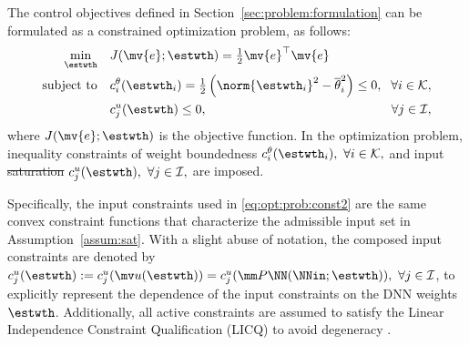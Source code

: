\documentclass[letterpaper, journal, twoside]{IEEEtran}
\providecommand{\DIFadd}[1]{{\protect\color{blue}\uwave{#1}}} %
\providecommand{\DIFdel}[1]{{\protect\color{red}\sout{#1}}} %
\providecommand{\DIFaddbegin}{} %
\providecommand{\DIFaddend}{} %
\providecommand{\DIFdelbegin}{} %
\providecommand{\DIFdelend}{} %
\begin{document}
The control objectives defined in Section~\ref{sec:problem:formulation} can be formulated as a constrained optimization problem, as follows:
\begin{subequations} \label{eq:opt:prob} 
  \begin{align} 
    \min_{\estwth} \quad 
    & 
    J(\mv{e};\estwth)
    = 
    \tfrac{1}{2} \mv{e}^\top \mv{e} 
    &
    \label{eq:opt:prob:obj} 
    \\ 
    \text{subject to} \quad  
    & 
    c^{\theta}_i(\estwth_i)=\tfrac{1}{2}
    \left(
      \norm{\estwth_i}^2
      -
      \overline{\theta}_i^2 
    \right)
    \le 0, 
    \!
    &
    \!
    \forall i\in\mathcal{K} 
    ,
    \label{eq:opt:prob:const1} 
    \\ 
    & 
    c^{u}_j(\estwth)
    \le 0, 
    &
    \forall j\in\mathcal{I} 
    \label{eq:opt:prob:const2} 
    ,
  \end{align}%
\end{subequations}
where $J(\mv{e};\estwth)$ is the objective function.
In the optimization problem, inequality constraints of weight boundedness $c^{\theta}_i(\estwth_i),\ \forall i\in\mathcal{K},$ and input \DIFdelbegin \DIFdel{saturation }\DIFdelend \DIFaddbegin \DIFadd{constraints }\DIFaddend $c^{u}_j(\estwth),\ \forall j\in\mathcal{I},$ are imposed.
\DIFaddbegin {}
\DIFaddend 

Specifically, the input constraints used in \eqref{eq:opt:prob:const2} are the same convex constraint functions that characterize the admissible input set in Assumption~\ref{assum:sat}.
With a slight abuse of notation, the composed input constraints are denoted by
$c_j^u(\estwth):=c_j^u(\mv u(\estwth))=c_j^u(\mm P\NN(\NNin;\estwth)),\ \forall j\in\mathcal I$, to explicitly represent the dependence of the input constraints on the DNN weights $\estwth$.
Additionally, all active constraints are assumed to satisfy the Linear Independence Constraint Qualification (LICQ) to avoid degeneracy \cite[pp. 465--467]{Nocedal:2006aa}.
\end{document}

